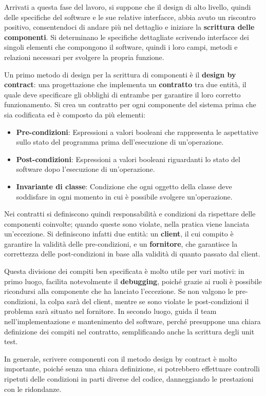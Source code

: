 \noindent Arrivati a questa fase del lavoro, si suppone che il design di alto livello, quindi delle specifiche del software e le sue relative interfacce,
abbia avuto un riscontro positivo, consentendoci di andare più nel dettaglio e iniziare la \textbf{scrittura delle componenti}. Si determinano le
specifiche dettagliate scrivendo interfacce dei singoli elementi che compongono il software, quindi i loro campi, metodi e relazioni necessari per
svolgere la propria funzione.\par
Un primo metodo di design per la scrittura di componenti è il \textbf{design by contract}: una progettazione che implementa un \textbf{contratto} tra
due entità, il quale deve specificare gli obblighi di entrambe per garantire il loro corretto funzionamento. Si crea un contratto per ogni componente
del sistema prima che sia codificata ed è composto da più elementi: \begin{itemize}
	\item \textbf{Pre-condizioni}: Espressioni a valori booleani che rappresenta le aspettative sullo stato del programma prima dell'esecuzione di
	un'operazione.
	\item \textbf{Post-condizioni}: Espressioni a valori booleani riguardanti lo stato del software dopo l'esecuzione di un'operazione.
	\item \textbf{Invariante di classe}: Condizione che ogni oggetto della classe deve soddisfare in ogni momento in cui è possibile svolgere
	un'operazione.
\end{itemize}
\noindent Nei contratti si definiscono quindi responsabilità e condizioni da rispettare delle componenti coinvolte; quando queste sono violate, nella
pratica viene lanciata un'eccezione. Si definiscono infatti due entità: un \textbf{client}, il cui compito è garantire la validità delle pre-condizioni,
e un \textbf{fornitore}, che garantisce la correttezza delle post-condizioni in base alla validità di quanto passato dal client.\par
Questa divisione dei compiti ben specificata è molto utile per vari motivi: in primo luogo, facilita notevolmente il \textbf{debugging}, poiché grazie
ai ruoli è possibile ricondursi alla componente che ha lanciato l'eccezione. Se non valgono le pre-condizioni, la colpa sarà del client, mentre se sono
violate le post-condizioni il problema sarà situato nel fornitore. In secondo luogo, guida il team nell'implementazione e mantenimento del software,
perché presuppone una chiara definizione dei compiti nel contratto, semplificando anche la scrittura degli unit test.\par
In generale, scrivere componenti con il metodo design by contract è molto importante, poiché senza una chiara definizione, si potrebbero effettuare
controlli ripetuti delle condizioni in parti diverse del codice, danneggiando le prestazioni con le ridondanze.

